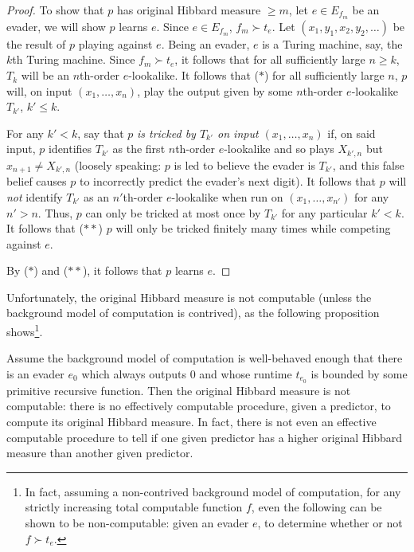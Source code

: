 \documentclass[twoside,11pt]{article}
\begin{document}
\begin{proof}
    To show that $p$ has original Hibbard measure $\geq m$,
    let $e\in E_{f_m}$ be an evader, we will show $p$ learns $e$.
    Since $e\in E_{f_m}$, $f_m\succ t_e$.
    Let $(x_1,y_1,x_2,y_2,\ldots)$ be the result of $p$ playing against $e$.
    Being an evader, $e$ is a Turing machine, say, the $k$th Turing machine.
    Since $f_m\succ t_e$, it follows that
    for all sufficiently large $n\geq k$, $T_k$ will be an $n$th-order $e$-lookalike.
    It follows that ($*$) for all sufficiently large $n$, $p$ will, on input
    $(x_1,\ldots,x_n)$, play the output given by some $n$th-order $e$-lookalike
    $T_{k'}$, $k'\leq k$.

    For any $k'<k$,
    say that $p$ \emph{is tricked by $T_{k'}$ on input $(x_1,\ldots,x_n)$}
    if, on said input, $p$ identifies $T_{k'}$ as the first
    $n$th-order $e$-lookalike and so plays $X_{k',n}$ but $x_{n+1}\not=X_{k',n}$
    (loosely speaking: $p$ is led to believe the evader is $T_{k'}$, and this
    false belief causes $p$ to incorrectly predict the evader's next digit).
    It follows that $p$ will \emph{not} identify $T_{k'}$ as an $n'$th-order
    $e$-lookalike when run on $(x_1,\ldots,x_{n'})$ for any $n'>n$.
    Thus, $p$ can only be tricked at most once by $T_{k'}$ for any particular $k'<k$.
    It follows that ($**$) $p$ will only be tricked finitely many times while competing
    against $e$.

    By ($*$) and ($**$), it follows that $p$ learns $e$.
\end{proof}

Unfortunately, the original Hibbard measure is not computable
(unless the background model of computation is contrived), as the following
proposition shows\footnote{In fact, assuming a non-contrived background
model of computation, for any strictly
increasing total computable function $f$,
even the following can be shown to be non-computable:
given an evader $e$, to determine whether or not $f\succ t_e$.}.

\begin{proposition}
\label{originalnoncomputableprop}
    Assume the background model of computation is well-behaved enough that
    there is an evader $e_0$ which always outputs $0$ and whose runtime $t_{e_0}$
    is bounded by some primitive recursive function.
    Then the original Hibbard measure is not computable:
    there is no effectively computable procedure, given a predictor, to compute its
    original Hibbard measure. In fact, there is not even an effective computable
    procedure to tell if one given predictor has a higher original Hibbard measure
    than another given predictor.
\end{proposition}
\end{document}
